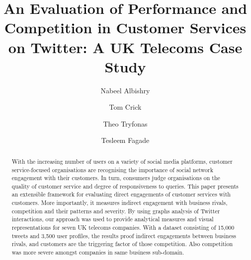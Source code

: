 \documentclass[sigconf]{acmart}
\begin{document}
\title[An Evaluation of Performance and Competition in Customer Services on
  Twitter]{An Evaluation of Performance and Competition in Customer Services on
  Twitter: A UK Telecoms Case Study}

\author{Nabeel Albishry}

\author{Tom Crick}

\author{Theo Tryfonas}


\author{Tesleem Fagade}



 
\renewcommand{\shortauthors}{Albishry, Crick, Tryfonas, and Fagade}


\begin{abstract}
With the increasing number of users on a variety of social media
platforms, customer service-focused organisations are recognising the
importance of social network engagement with their customers. In turn,
consumers judge organisations on the quality of customer service and
degree of responsiveness to queries. This paper presents an extensible
framework for evaluating direct engagements of customer services with
customers. More importantly, it measures indirect engagement with business rivals,
competition and their patterns and severity. By using graphs analysis
of Twitter interactions, our approach was used to provide analytical
measures and visual representations for seven UK telecoms
companies. With a dataset consisting of 15,000 tweets and 3,500 user
profiles, the results proof indirect engagements between business rivals, and 
customers are the triggering factor of those competition. 
Also competition was more severe amongst companies in same business sub-domain.
\end{abstract}

\end{document}
